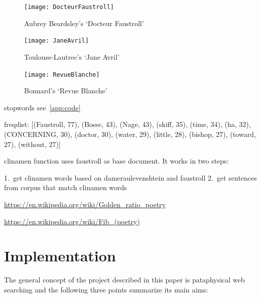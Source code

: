 \begin{figure}[htbp]
  \centering
  \texttt{[image: DocteurFaustroll]}
  \caption[Aubrey Beardsley's `Docteur Faustroll']{Aubrey Beardsley's `Docteur Faustroll'}
\label{fig:beardsley}
\end{figure}

\begin{figure}[htbp]
  \centering
  \texttt{[image: JaneAvril]}
  \caption[Toulouse-Lautrec's `Jane Avril']{Toulouse-Lautrec's `Jane Avril'}
\label{fig:toulouse}
\end{figure}

\begin{figure}[htbp]
  \centering
  \texttt{[image: RevueBlanche]}
  \caption[Bonnard's `Revue Blanche']{Bonnard's `Revue Blanche'}
\label{fig:bonnard}
\end{figure}




stopwords see~\ref{app:code}

freqdist:
[(Faustroll, 77), (Bosse, 43), (Nage, 43), (skiff, 35), (time, 34), (ha, 32),  (CONCERNING, 30), (doctor, 30), (water, 29), (little, 28), (bishop, 27), (toward, 27), (without, 27)]



clinamen function uses faustroll as base document. It works in two steps:

1.\ get clinamen words based on dameraulevenshtein and faustroll
2.\ get sentences from corpus that match clinamen words


\url{https://en.wikipedia.org/wiki/Golden_ratio_poetry}

\url{https://en.wikipedia.org/wiki/Fib_(poetry)} %










\section{Implementation}

The general concept of the project described in this paper is pataphysical web searching and the following three points summarize its main aims:

